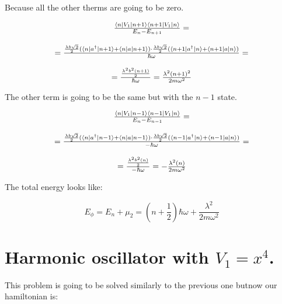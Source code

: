 Because all the other therms are going to be zero.

\begin{equation}
  \begin{array}{c}
    \frac{\langle n\rvert V_1\lvert n+1\rangle\langle n+1\rvert V_1\lvert n\rangle}{E_{n}-E_{n+1}} =
    \\

    \\
    =\frac{\frac{\lambda b \sqrt{2}}{2} (\langle n\rvert a^\dagger\lvert n+1\rangle+\langle n\rvert a\lvert n+1\rangle) \cdot \frac{\lambda b \sqrt{2}}{2} (\langle n+1\rvert a^\dagger\lvert n\rangle+\langle n+1\rvert a\lvert n\rangle)}{\hbar \omega} =
    \\

    \\
    = \frac{\frac{\lambda^2 b^2 (n+1)}{2} }{\hbar \omega} = \frac{\lambda^2 (n+1)^2}{2 m \omega^2}
  \end{array}
\end{equation}

The other term is going to be the same but with the $n-1$ state.

\begin{equation}
  \begin{array}{c}
    \frac{\langle n\rvert V_1\lvert n-1\rangle\langle n-1\rvert V_1\lvert n\rangle}{E_{n}-E_{n-1}} =
    \\

    \\
    =\frac{\frac{\lambda b \sqrt{2}}{2} (\langle n\rvert a^\dagger\lvert n-1\rangle+\langle n\rvert a\lvert n-1\rangle) \cdot \frac{\lambda b \sqrt{2}}{2} (\langle n-1\rvert a^\dagger\lvert n\rangle+\langle n-1\rvert a\lvert n\rangle)}{-\hbar \omega} =
    \\

    \\
    = \frac{\frac{\lambda^2 b^2 (n)}{2} }{-\hbar \omega} = -\frac{\lambda^2 (n)}{2 m \omega^2}
  \end{array}
\end{equation}

The total energy looks like:

\begin{equation}
  E_{\phi} = E_n + \mu_2 = \left(n+\frac{1}{2}\right)\hbar \omega + \frac{\lambda^2}{2m\omega^2}
\end{equation}

\section{Harmonic oscillator with $V_1 = x^4$.}

This problem is going to be solved similarly to the previous one butnow our hamiltonian is:

